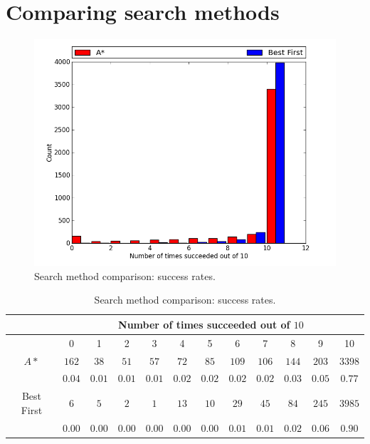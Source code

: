\section{Comparing search methods}

\begin{figure}[H]
\begin{center}
\includegraphics[width=\textwidth]{Images/search_success_comparison.png}
\caption{Search method comparison: success rates.}
\label{fig:search_success}
\end{center}
\end{figure}

\begin{table}[H]
\begin{center}
\begin{singlespace}
\begin{tabular}{|c||c|c|c|c|c|c|c|c|c|c|c|}
\hline
 & \multicolumn{11}{|c|}{Number of times succeeded out of $10$} \\
\hline
 & 0 & 1 & 2 & 3 & 4 & 5 & 6 & 7 & 8 & 9 & 10 \\
\hline\hline
$A*$ & $162$ & $38$ & $51$ & $57$ & $72$ & $85$ & $109$ & $106$ & $144$ & $203$ & $3398$ \\
 & $0.04$ & $0.01$ & $0.01$ & $0.01$ & $0.02$ & $0.02$ & $0.02$ & $0.02$ & $0.03$ & $0.05$ & $0.77$ \\
\hline
 Best First & $6$ & $5$ & $2$ & $1$ & $13$ & $10$ & $29$ & $45$ & $84$ & $245$ & $3985$ \\
  & $0.00$ & $0.00$ & $0.00$ & $0.00$ & $0.00$ & $0.00$ & $0.01$ & $0.01$ & $0.02$ & $0.06$ & $0.90$ \\
\hline
\end{tabular}
\end{singlespace}
\end{center}
\label{tb:search_success}
\caption{Search method comparison: success rates.}
\end{table}

